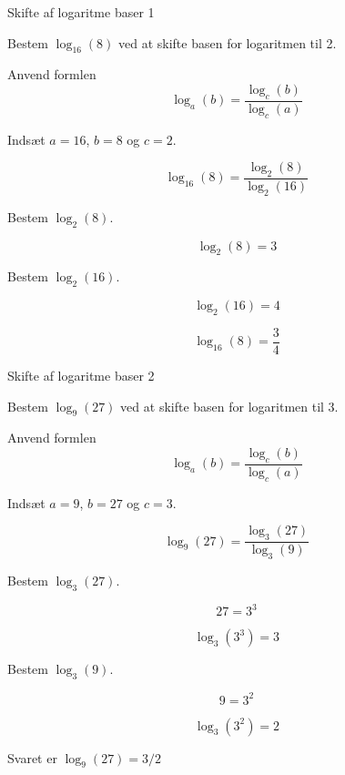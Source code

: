 \documentclass{article}
\begin{document}
\tableofcontents
\newpage

\begin{exercise}{Skifte af logaritme baser 1}

Bestem $\log_{16}(8)$ ved at skifte basen for logaritmen til 2.


\hint

Anvend formlen
\[
\log_a(b) = \frac{\log_c(b)}{\log_c(a)}
\]

\hint

Indsæt $a=16$, $b=8$ og $c=2$.

\hint
\[
\log_{16}(8) = \frac{\log_2(8)}{\log_2(16)}
\]

\hint
Bestem $\log_2(8)$.

\hint
\[
\log_2(8) = 3
\]

\hint
Bestem $\log_2(16)$.

\hint
\[
\log_2(16) = 4
\]

\hint
\[
\log_{16}(8) = \frac{3}{4}
\]


\end{exercise}

\newpage
\begin{exercise}{Skifte af logaritme baser 2}

Bestem $\log_{9}(27)$ ved at skifte basen for logaritmen til 3.


\hint

Anvend formlen
\[
\log_a(b) = \frac{\log_c(b)}{\log_c(a)}
\]

\hint

Indsæt $a=9$, $b=27$ og $c=3$.

\hint
\[
\log_{9}(27) = \frac{\log_3(27)}{\log_3(9)}
\]

\hint
Bestem $\log_3(27)$.

\hint
\[
27 = 3^3
\]


\hint
\[
\log_3(3^3) = 3
\]

\hint
Bestem $\log_3(9)$.

\hint
\[
9 = 3^2
\]

\hint
\[
\log_3(3^2) = 2
\]

\hint
Svaret er $\log_{9}(27) = 3/2$


\end{exercise}
\end{document}
